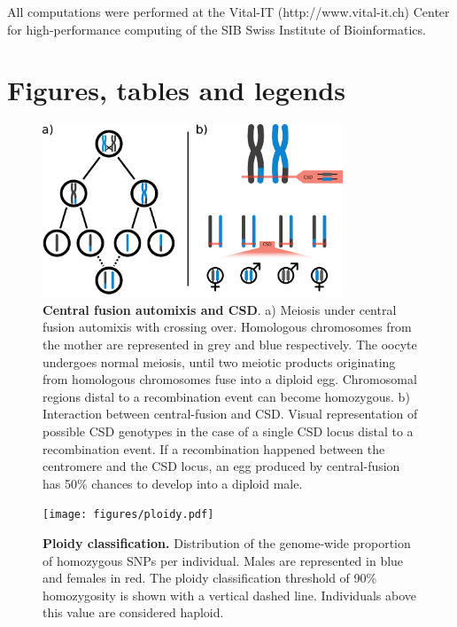 \documentclass[11pt,a4paper]{report}
\begin{document}
All computations were performed at the Vital-IT (http://www.vital-it.ch) Center for high-performance computing of the SIB Swiss Institute of Bioinformatics.

\section{Figures, tables and legends}

\begin{figure}[!ht]
  \centering
  \includegraphics[width=0.8\textwidth]{figures/CFA_CSD_simple.png}
  \caption{\textbf{Central fusion automixis and CSD}. a) Meiosis under central fusion automixis with crossing over. Homologous chromosomes from the mother are represented in grey and blue respectively. The oocyte undergoes normal meiosis, until two meiotic products originating from homologous chromosomes fuse into a diploid egg. Chromosomal regions distal to a recombination event can become homozygous. b) Interaction between central-fusion and CSD. Visual representation of possible CSD genotypes in the case of a single CSD locus distal to a recombination event. If a recombination happened between the centromere and the CSD locus, an egg produced by central-fusion has 50\% chances to develop into a diploid male.}
  \label{CFA}
\end{figure}

\begin{figure}[!ht]
  \centering
  \texttt{[image: figures/ploidy.pdf]}
  \caption{\textbf{Ploidy classification.} Distribution of the genome-wide proportion of homozygous SNPs per individual. Males are represented in blue and females in red. The ploidy classification threshold of 90\% homozygosity is shown with a vertical dashed line. Individuals above this value are considered haploid.}
  \label{ploidy}
\end{figure}
\end{document}

